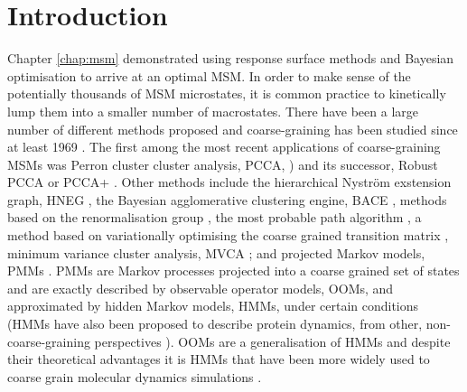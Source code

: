 \section{Introduction}
Chapter \ref{chap:msm} demonstrated using response surface methods and Bayesian optimisation to arrive at an optimal MSM. In order to make sense of the potentially thousands of MSM microstates, it is common practice to kinetically lump them into a smaller number of macrostates. There have been a large number of different methods proposed and coarse-graining has been studied since at least 1969 \cite{kuoLumpingAnalysisMonomolecular, weiLumpingAnalysisMonomolecular1969}. The first among the most recent applications of coarse-graining MSMs was Perron cluster cluster analysis, PCCA, \cite{deuflhardIdentificationAlmostInvariant2000a}) and its successor, Robust PCCA or PCCA+ \cite{deuflhardRobustPerronCluster2005b}. Other methods include the hierarchical Nystr{\"o}m exstension graph, HNEG \cite{yaoHierarchicalNystromMethods2013a}, the Bayesian agglomerative clustering engine, BACE \cite{bowmanImprovedCoarsegrainingMarkov2012a}, methods based on the renormalisation group \cite{orioliDimensionalReductionMarkov2016c, hummerOptimalDimensionalityReduction2015a}, the most probable path algorithm \cite{jainIdentifyingMetastableStates2012a}, a method based on variationally optimising the coarse grained transition matrix \cite{martiniVariationalIdentificationMarkovian2017a},  minimum variance cluster analysis, MVCA \cite{husicMinimumVarianceClustering2018}; and projected Markov models, PMMs \cite{noeProjectedHiddenMarkov2013a}. PMMs are Markov processes projected into a coarse grained set of states and are exactly described by observable operator models, OOMs, \cite{wuProjectedMetastableMarkov2015} and approximated by hidden Markov models, HMMs, \cite{noeProjectedHiddenMarkov2013a} under certain conditions (HMMs have also been proposed to describe protein dynamics, from other, non-coarse-graining perspectives \cite{mcgibbonUnderstandingProteinDynamics}). OOMs are a generalisation of HMMs \cite{jaegerDiscretetimeDiscretevaluedObservable} and despite their theoretical advantages it is HMMs that have been more widely used to coarse grain molecular dynamics simulations \cite{mondalAtomicResolutionMechanism2018a, plattnerCompleteProteinProtein2017, panConformationalHeterogeneityMichaelis2016, juarez-jimenezDynamicDesignManipulation2020, wangDynamicalBehaviorVLactamases2019,FastFoldingPathwaysThrombinBinding2018,remingtonFluorescenceQuenching2aminopurinelabeled2019,curado-carballadaHiddenConformationsAspergillus2019,furiniIontriggeredSelectivityBacterial2018,yangMappingPathwayDynamics2018,ahalawatMappingSubstrateRecognition2018,olaposiMembraneBoundTranscriptionFactor2019, xiaoNaBindingModes2019, hansonWhatMakesKinase2019}. 

